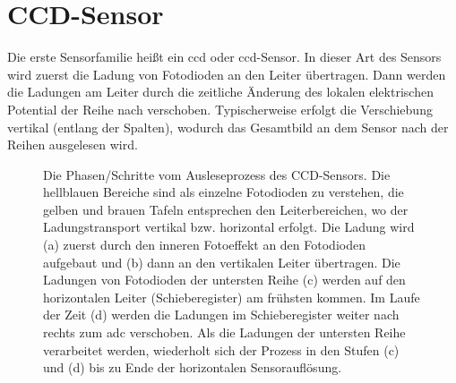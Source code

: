\section{CCD-Sensor}
Die erste Sensorfamilie heißt ein \gls{ccd} oder \gls{ccd}-Sensor. In dieser Art des Sensors wird zuerst die Ladung von Fotodioden an den Leiter übertragen. Dann werden die Ladungen am Leiter durch die zeitliche Änderung des lokalen elektrischen Potential der Reihe nach verschoben. Typischerweise erfolgt die Verschiebung vertikal (entlang der Spalten), wodurch das Gesamtbild an dem Sensor nach der Reihen ausgelesen wird.
\begin{figure}[H]
    \centering
    \caption{Die Phasen/Schritte vom Ausleseprozess des CCD-Sensors. Die hellblauen Bereiche sind als einzelne Fotodioden zu verstehen, die gelben und brauen Tafeln entsprechen den Leiterbereichen, wo der Ladungstransport vertikal bzw. horizontal erfolgt. Die Ladung wird (a) zuerst durch den inneren Fotoeffekt an den Fotodioden aufgebaut und (b) dann an den vertikalen Leiter übertragen. Die Ladungen von Fotodioden der untersten Reihe (c) werden auf den horizontalen Leiter (Schieberegister) am frühsten kommen. Im Laufe der Zeit (d) werden die Ladungen im Schieberegister weiter nach rechts zum \gls{adc} verschoben. Als die Ladungen der untersten Reihe verarbeitet werden, wiederholt sich der Prozess in den Stufen (c) und (d) bis zu Ende der horizontalen Sensorauflösung.}
    \label{fig:ccd_scheme}
\end{figure}
